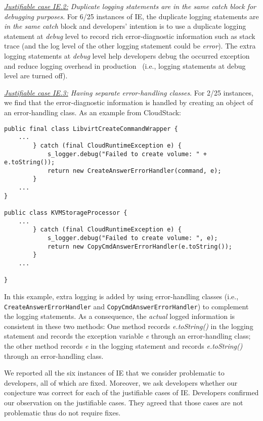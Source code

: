 {\em \underline{Justifiable case IE.2:} Duplicate logging statements are in the same catch block for debugging purposes}.
For 6/25 instances of IE, the duplicate logging statements are {\em in the same} {\em catch} block and developers' intention is to use a duplicate logging statement at {\em debug} level to record rich error-diagnostic information such as stack trace (and the log level of the other logging statement could be {\em error}). The extra logging statements at {\em debug} level help developers debug the occurred exception and reduce logging overhead in production~\cite{Li2017} (i.e., logging statements at debug level are turned off). %

{\em \underline{Justifiable case IE.3:} Having separate error-handling classes}. For 2/25 instances, we find that the error-diagnostic information is handled by creating an object of an error-handling class. As an example from CloudStack:

\begin{lstlisting}
public final class LibvirtCreateCommandWrapper {
    ...
        } catch (final CloudRuntimeException e) {
            s_logger.debug("Failed to create volume: " + e.toString());
            return new CreateAnswerErrorHandler(command, e);
        }
    ...
}

public class KVMStorageProcessor {
    ...
        } catch (final CloudRuntimeException e) {
            s_logger.debug("Failed to create volume: ", e);
            return new CopyCmdAnswerErrorHandler(e.toString());
        }
    ...

}
\end{lstlisting}
In this example, extra logging is added by using error-handling classes (i.e., {\tt\small CreateAnswerErrorHandler} and {\tt\small CopyCmdAnswerErrorHandler}) to complement the logging statements. As a consequence, the {\em actual} logged information is consistent in these two methods: One method records {\em e.toString()} in the logging statement and records the exception variable {\em e} through an error-handling class; the other method records {\em e} in the logging statement and records {\em e.toString()} through an error-handling class.

 We reported all the six instances of IE that we consider problematic to developers, all of which are fixed. Moreover, we ask developers whether our conjecture was correct for each of the justifiable cases of IE. Developers confirmed our observation on the justifiable cases. They agreed that those cases are not problematic thus do not require fixes. 



